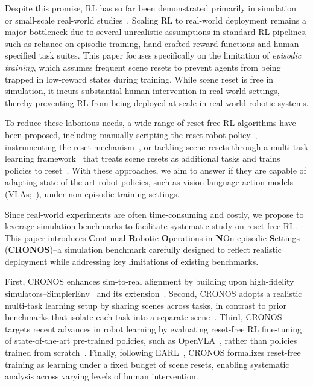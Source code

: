 Despite this promise, RL has so far been demonstrated primarily in simulation~\cite{yu2020metaworld,tunyasuvunakool2020dmcontrol} or small-scale real-world studies~\cite{levine2016end,yahya2017collective,kalashnikov2018scalable,ankile2025residual}. Scaling RL to real-world deployment remains a major bottleneck due to several unrealistic assumptions in standard RL pipelines, such as reliance on episodic training, hand-crafted reward functions and human-specified task suites. This paper focuses specifically on the limitation of \emph{episodic training}, which assumes frequent scene resets to prevent agents from being trapped in low-reward states during training. While scene reset is free in simulation, it incurs substantial human intervention in real-world settings, thereby preventing RL from being deployed at scale in real-world robotic systems.

To reduce these laborious needs, a wide range of reset-free RL algorithms have been proposed, including manually scripting the reset robot policy~\cite{levine2016end,sharma2020emergent}, instrumenting the reset mechanism~\cite{zeng2020tossingbot,kalashnikov2018scalable,kalashnikov2021mtopt}, or tackling scene resets through a multi-task learning framework~\cite{gupta2021resetfree} that treats scene resets as additional tasks and trains policies to reset~\cite{eysenbach2017leavenottrace,zhu2020ingredients}. With these approaches, we aim to answer if they are capable of adapting state-of-the-art robot policies, such as vision-language-action models (VLAs;~\cite{kim2024openvla,li2024cogact,qu2025spatialvla}), under non-episodic training settings.

Since real-world experiments are often time-consuming and costly, we propose to leverage simulation benchmarks to facilitate systematic study on reset-free RL. This paper introduces \textbf{C}ontinual \textbf{R}obotic \textbf{O}perations in \textbf{N}On-episodic \textbf{S}ettings (\textbf{CRONOS})--a simulation benchmark carefully designed to reflect realistic deployment while addressing key limitations of existing benchmarks.

First, CRONOS enhances sim-to-real alignment by building upon high-fidelity simulators--SimplerEnv~\cite{li2024simpler} and its extension~\cite{liu2025rlvla}. Second, CRONOS adopts a realistic multi-task learning setup by sharing scenes across tasks, in contrast to prior benchmarks that isolate each task into a separate scene~\cite{yang2024robot}. Third, CRONOS targets recent advances in robot learning by evaluating reset-free RL fine-tuning of state-of-the-art pre-trained policies, such as OpenVLA~\cite{kim2024openvla}, rather than policies trained from scratch~\cite{gupta2021resetfree}. Finally, following EARL~\cite{sharma2021earl}, CRONOS formalizes reset-free training as learning under a fixed budget of scene resets, enabling systematic analysis across varying levels of human intervention.

